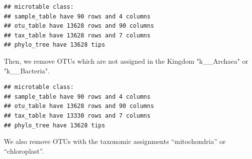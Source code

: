 \documentclass[
]{book}
\newenvironment{Shaded}{\begin{snugshade}}{\end{snugshade}}
\newcommand{\AttributeTok}[1]{\textcolor[rgb]{0.77,0.63,0.00}{#1}}
\newcommand{\CommentTok}[1]{\textcolor[rgb]{0.56,0.35,0.01}{\textit{#1}}}
\newcommand{\FunctionTok}[1]{\textcolor[rgb]{0.00,0.00,0.00}{#1}}
\newcommand{\NormalTok}[1]{#1}
\newcommand{\SpecialCharTok}[1]{\textcolor[rgb]{0.00,0.00,0.00}{#1}}
\newcommand{\StringTok}[1]{\textcolor[rgb]{0.31,0.60,0.02}{#1}}
\begin{document}
\begin{Shaded}
\end{Shaded}

\begin{verbatim}
## microtable class:
## sample_table have 90 rows and 4 columns
## otu_table have 13628 rows and 90 columns
## tax_table have 13628 rows and 7 columns
## phylo_tree have 13628 tips
\end{verbatim}

Then, we remove OTUs which are not assigned in the Kingdom "k\_\_Archaea" or "k\_\_Bacteria".

\begin{Shaded}
\end{Shaded}

\begin{verbatim}
## microtable class:
## sample_table have 90 rows and 4 columns
## otu_table have 13628 rows and 90 columns
## tax_table have 13330 rows and 7 columns
## phylo_tree have 13628 tips
\end{verbatim}

We also remove OTUs with the taxonomic assignments ``mitochondria'' or ``chloroplast''.

\begin{Shaded}
\end{Shaded}
\end{document}
